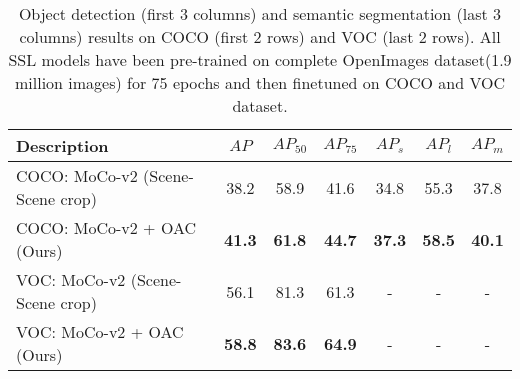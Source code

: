 \begin{table*}
    \centering
    \begin{tabu} to \linewidth {lcccccc} 
        \toprule
        Description & $AP$ & $AP_{50}$ & $AP_{75}$ & $AP_{s}$ & $AP_{l}$ & $AP_{m}$ \\
        
    
     \midrule
    COCO: MoCo-v2 (Scene-Scene crop) & 38.2 & 58.9 & 41.6 & 34.8 & 55.3 & 37.8\\
    
   
   
    COCO: MoCo-v2 + OAC (Ours) & \textbf{41.3} & \textbf{61.8} & \textbf{44.7} & \textbf{37.3} & \textbf{58.5} & \textbf{40.1}\\
    \midrule
    VOC: MoCo-v2 (Scene-Scene crop) & 56.1 & 81.3 & 61.3 & - & - & -\\
    VOC: MoCo-v2 + OAC (Ours)  &  \textbf{58.8} &  \textbf{83.6} & \textbf{64.9} & - & - & -\\
        \bottomrule
    \end{tabu}
    \caption{Object detection (first 3 columns) and semantic segmentation (last 3 columns) results on COCO (first 2 rows) and VOC (last 2 rows). All SSL models have been pre-trained on complete OpenImages dataset(1.9 million images) for 75 epochs and then finetuned on COCO and VOC dataset.}
    \label{tab:openimages_full_results}
\end{table*}

